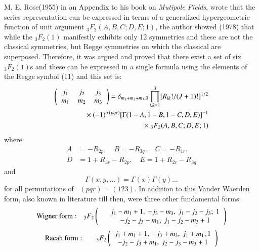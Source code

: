 M. E. Rose(1955) in an Appendix to his book on \textit{Mutipole Fields}, wrote that the series representation can be expressed in terms of a generalized hypergeometric function of unit argument ${}_3F_2(A, B, C; D, E; 1)$,  the author showed (1978) that while the $_3F_2(1)$ manifestly exhibits only 12 symmetries and these are not the classical symmetries, but Regge symmetries on which the classical are superposed. Therefore, it was argued and proved that there exist a set of six $_3F_2(1)$s and these can be expressed in a single formula using the elements of the Regge symbol (11) and this set is:
\begin{equation}
\begin{split}
\left(
\begin{tabular}{ccc}
$j_1$&  $j_2$& $j_3$ \\ $m_1$& $m_2$& $m_3$ \\ 
\end{tabular}
\right) 
=  \delta_{m_1+m_2+m_3,0} \prod_{i,k=1}^3 [R_{ik}!/(J+1)!]^{1/2}\\
\times \ (-1)^{\sigma(pqr)} [\Gamma(1-A, 1-B, 1-C, D, E)]^{-1}\\
\times \ {}_3F_2(A, B, C; D, E; 1)\hfill \label{chap7-eq13}
\end{split}
\end{equation}
where
\begin{equation}
\begin{split}
A & =-R_{2p},\quad B=-R_{3q},\quad C=-R_{1r},\\
D & =1+R_{3r}-R_{2p},\quad E=1+R_{2r}-R_{3q} \label{chap7-eq14}
\end{split}
\end{equation}
and 
\begin{equation}
\Gamma(x,y,\ldots)=\Gamma(x)\Gamma(y)\ldots \label{chap7-eq15}
\end{equation}
for all permutations of \ $(pqr)=(123)$. In addition to this Vander Waerden form, also known in literature till then, were three other fundamental forms:
\begin{equation}
{\rm Wigner\ form:}\quad {}_3F_2
\left(
\begin{tabular}{lc}
&$j_1-m_1+1,\ -j_3-m_3,\ j_1-j_2-j_3;\ 1$\\
&$-j_2-j_3-m_1,\ j_1-j_2-m_3+1$\\ 
\end{tabular} 
\right) \label{chap7-eq16}
\end{equation}
\smallskip
\begin{equation}
{\rm Racah\ form:}\qquad {}_3F_2
\left(
\begin{tabular}{c}
$j_1+m_1+1,\ -j_3+m_3,\ j_1+m_1; 1$\\
$-j_2-j_3+m_1,\ j_2-j_3-m_3+1$\\ 
\end{tabular} 
\right) \label{chap7-eq17}
\end{equation}
